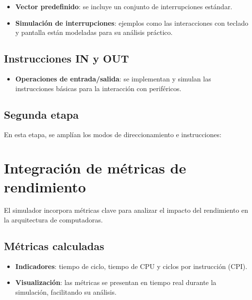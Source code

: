 \documentclass[12pt,oneside]{templates/unerthesis}
\providecommand{\tightlist}{%
  \setlength{\itemsep}{0pt}\setlength{\parskip}{0pt}}
\begin{document}
\begin{itemize}
\tightlist
\item
  \textbf{Vector predefinido}: se incluye un conjunto de interrupciones estándar.
\item
  \textbf{Simulación de interrupciones}: ejemplos como las interacciones con teclado y pantalla están modeladas para su análisis práctico.
\end{itemize}

\hypertarget{instrucciones-in-y-out}{%
\subsection{Instrucciones IN y OUT}\label{instrucciones-in-y-out}}

\begin{itemize}
\tightlist
\item
  \textbf{Operaciones de entrada/salida}: se implementan y simulan las instrucciones básicas para la interacción con periféricos.
\end{itemize}

\hypertarget{segunda-etapa}{%
\subsection{Segunda etapa}\label{segunda-etapa}}

En esta etapa, se amplían los modos de direccionamiento e instrucciones:

\hypertarget{integraciuxf3n-de-muxe9tricas-de-rendimiento}{%
\section{Integración de métricas de rendimiento}\label{integraciuxf3n-de-muxe9tricas-de-rendimiento}}

El simulador incorpora métricas clave para analizar el impacto del rendimiento en la arquitectura de computadoras.

\hypertarget{muxe9tricas-calculadas}{%
\subsection{Métricas calculadas}\label{muxe9tricas-calculadas}}

\begin{itemize}
\tightlist
\item
  \textbf{Indicadores}: tiempo de ciclo, tiempo de CPU y ciclos por instrucción (CPI).
\item
  \textbf{Visualización}: las métricas se presentan en tiempo real durante la simulación, facilitando su análisis.
\end{itemize}
\end{document}
